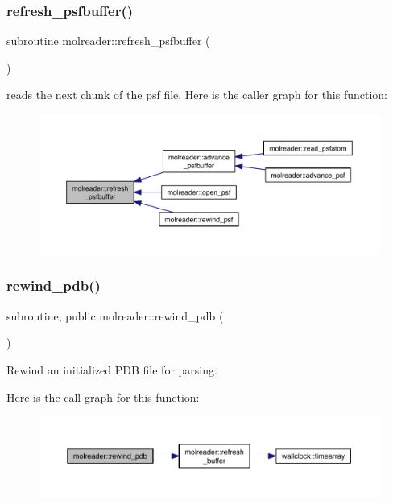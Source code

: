 \subsubsection{\texorpdfstring{refresh\+\_\+psfbuffer()}{refresh\_psfbuffer()}}
{\footnotesize\ttfamily subroutine molreader\+::refresh\+\_\+psfbuffer (\begin{DoxyParamCaption}{ }\end{DoxyParamCaption})\hspace{0.3cm}{\ttfamily [private]}}

reads the next chunk of the psf file. Here is the caller graph for this function\+:\nopagebreak
\begin{figure}[H]
\begin{center}
\leavevmode
\includegraphics[width=350pt]{namespacemolreader_a13131c46b34d0385ba7eadd0b1b88df9_icgraph}
\end{center}
\end{figure}
\mbox{\label{namespacemolreader_af85c66302e278af03e0cc94dc42e662e}} 
\subsubsection{\texorpdfstring{rewind\+\_\+pdb()}{rewind\_pdb()}}
{\footnotesize\ttfamily subroutine, public molreader\+::rewind\+\_\+pdb (\begin{DoxyParamCaption}{ }\end{DoxyParamCaption})}



Rewind an initialized P\+DB file for parsing. 

Here is the call graph for this function\+:\nopagebreak
\begin{figure}[H]
\begin{center}
\leavevmode
\includegraphics[width=350pt]{namespacemolreader_af85c66302e278af03e0cc94dc42e662e_cgraph}
\end{center}
\end{figure}
\mbox{\label{namespacemolreader_a6d79c8d97fd91cfb25dec2b67320c77b}} 
